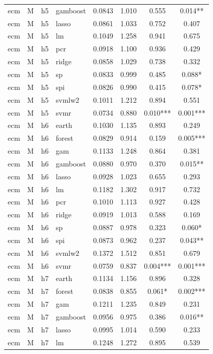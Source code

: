 \begin{ThreePartTable}
\begin{longtable}[t]{llclcccc}
ecm & M & h5 & gamboost & 0.0843 & 1.010 & 0.555 & 0.014**\\
ecm & M & h5 & lasso & 0.0861 & 1.033 & 0.752 & 0.407\\
ecm & M & h5 & lm & 0.1049 & 1.258 & 0.941 & 0.675\\
ecm & M & h5 & pcr & 0.0918 & 1.100 & 0.936 & 0.429\\
ecm & M & h5 & ridge & 0.0858 & 1.029 & 0.738 & 0.332\\
ecm & M & h5 & sp & 0.0833 & 0.999 & 0.485 & 0.088*\\
ecm & M & h5 & spi & 0.0826 & 0.990 & 0.415 & 0.078*\\
ecm & M & h5 & svmlw2 & 0.1011 & 1.212 & 0.894 & 0.551\\
ecm & M & h5 & svmr & 0.0734 & 0.880 & 0.010*** & 0.001***\\
\addlinespace
ecm & M & h6 & earth & 0.1030 & 1.135 & 0.893 & 0.249\\
ecm & M & h6 & forest & 0.0829 & 0.914 & 0.159 & 0.005***\\
ecm & M & h6 & gam & 0.1133 & 1.248 & 0.864 & 0.381\\
ecm & M & h6 & gamboost & 0.0880 & 0.970 & 0.370 & 0.015**\\
ecm & M & h6 & lasso & 0.0928 & 1.023 & 0.655 & 0.293\\
ecm & M & h6 & lm & 0.1182 & 1.302 & 0.917 & 0.732\\
ecm & M & h6 & pcr & 0.1010 & 1.113 & 0.927 & 0.428\\
ecm & M & h6 & ridge & 0.0919 & 1.013 & 0.588 & 0.169\\
ecm & M & h6 & sp & 0.0887 & 0.978 & 0.323 & 0.060*\\
ecm & M & h6 & spi & 0.0873 & 0.962 & 0.237 & 0.043**\\
ecm & M & h6 & svmlw2 & 0.1372 & 1.512 & 0.851 & 0.679\\
ecm & M & h6 & svmr & 0.0759 & 0.837 & 0.004*** & 0.001***\\
\addlinespace
ecm & M & h7 & earth & 0.1134 & 1.156 & 0.896 & 0.328\\
ecm & M & h7 & forest & 0.0838 & 0.855 & 0.061* & 0.002***\\
ecm & M & h7 & gam & 0.1211 & 1.235 & 0.849 & 0.231\\
ecm & M & h7 & gamboost & 0.0956 & 0.975 & 0.386 & 0.016**\\
ecm & M & h7 & lasso & 0.0995 & 1.014 & 0.590 & 0.233\\
ecm & M & h7 & lm & 0.1248 & 1.272 & 0.895 & 0.539\\

\end{longtable}
\end{ThreePartTable}
